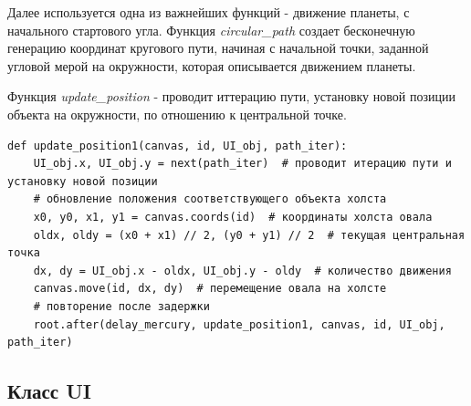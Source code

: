 \documentclass[11pt,a4paper]{report}
\begin{document}
Далее используется одна из важнейших функций - движение планеты, с начального стартового угла.
Функция \textit{circular\_path} создает бесконечную генерацию координат кругового пути, начиная с начальной точки, заданной угловой мерой на окружности, которая описывается движением планеты.

Функция \textit{update\_position}  - проводит иттерацию пути, установку новой позиции объекта на окружности, по отношению к центральной точке. 


\begin{verbatim}
def update_position1(canvas, id, UI_obj, path_iter):
    UI_obj.x, UI_obj.y = next(path_iter)  # проводит итерацию пути и установку новой позиции
    # обновление положения соответствующего объекта холста
    x0, y0, x1, y1 = canvas.coords(id)  # координаты холста овала
    oldx, oldy = (x0 + x1) // 2, (y0 + y1) // 2  # текущая центральная точка
    dx, dy = UI_obj.x - oldx, UI_obj.y - oldy  # количество движения
    canvas.move(id, dx, dy)  # перемещение овала на холсте
    # повторение после задержки
    root.after(delay_mercury, update_position1, canvas, id, UI_obj, path_iter)
\end{verbatim}
\subsection{Класс UI}
\end{document}
